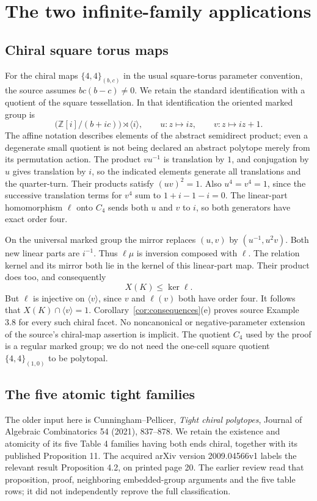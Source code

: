 \section{The two infinite-family applications}
\subsection{Chiral square torus maps}
For the chiral maps $\{4,4\}_{(b,c)}$ in the usual square-torus parameter convention, the source assumes $bc(b-c)\ne0$. We retain the standard identification with a quotient of the square tessellation. In that identification the oriented marked group is
\[
     \bigl(\mathbb Z[i]/(b+ic)\bigr)\rtimes\langle i\rangle,
 \qquad u:z\mapsto iz,\qquad v:z\mapsto iz+1.
\]
The affine notation describes elements of the abstract semidirect product; even a degenerate small quotient is not being declared an abstract polytope merely from its permutation action. The product $vu^{-1}$ is translation by $1$, and conjugation by $u$ gives translation by $i$, so the indicated elements generate all translations and the quarter-turn. Their products satisfy $(uv)^2=1$. Also $u^4=v^4=1$, since the successive translation terms for $v^4$ sum to $1+i-1-i=0$. The linear-part homomorphism $\ell$ onto $C_4$ sends both $u$ and $v$ to $i$, so both generators have exact order four.

On the universal marked group the mirror replaces $(u,v)$ by $(u^{-1},u^2v)$. Both new linear parts are $i^{-1}$. Thus $\ell\mu$ is inversion composed with $\ell$. The relation kernel and its mirror both lie in the kernel of this linear-part map. Their product does too, and consequently
\[
                         X(K)\leq\ker\ell.
\]
But $\ell$ is injective on $\langle v\rangle$, since $v$ and $\ell(v)$ both have order four. It follows that $X(K)\cap\langle v\rangle=1$. Corollary~\ref{cor:consequences}(e) proves source Example 3.8 for every such chiral facet. No noncanonical or negative-parameter extension of the source's chiral-map assertion is implicit. The quotient $C_4$ used by the proof is a regular marked group; we do not need the one-cell square quotient $\{4,4\}_{(1,0)}$ to be polytopal.

\subsection{The five atomic tight families}
The older input here is Cunningham--Pellicer, \emph{Tight chiral polytopes}, Journal of Algebraic Combinatorics 54 (2021), 837--878. We retain the existence and atomicity of its five Table 4 families having both ends chiral, together with its published Proposition 11. The acquired arXiv version 2009.04566v1 labels the relevant result Proposition 4.2, on printed page 20. The earlier review read that proposition, proof, neighboring embedded-group arguments and the five table rows; it did not independently reprove the full classification.

